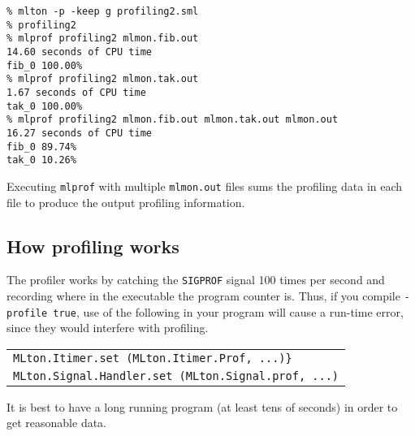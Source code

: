 \begin{verbatim}
% mlton -p -keep g profiling2.sml
% profiling2
% mlprof profiling2 mlmon.fib.out
14.60 seconds of CPU time
fib_0 100.00%
% mlprof profiling2 mlmon.tak.out
1.67 seconds of CPU time
tak_0 100.00%
% mlprof profiling2 mlmon.fib.out mlmon.tak.out mlmon.out
16.27 seconds of CPU time
fib_0 89.74%
tak_0 10.26%
\end{verbatim}

Executing {\tt mlprof} with multiple {\tt mlmon.out} files sums the
profiling data in each file to produce the output profiling
information.

\subsection{How profiling works}

The profiler works by catching the {\tt SIGPROF} signal 100 times per
second and recording where in the executable the program counter is.
Thus, if you compile {\tt -profile true}, use of the following in your
program will cause a run-time error, since they would interfere with
profiling.

\begin{tabular}{l}
\tt MLton.Itimer.set (MLton.Itimer.Prof, ...)\}\\
\tt MLton.Signal.Handler.set (MLton.Signal.prof, ...)
\end{tabular}
It is best to have a long running program (at least tens of seconds)
in order to get reasonable data.
